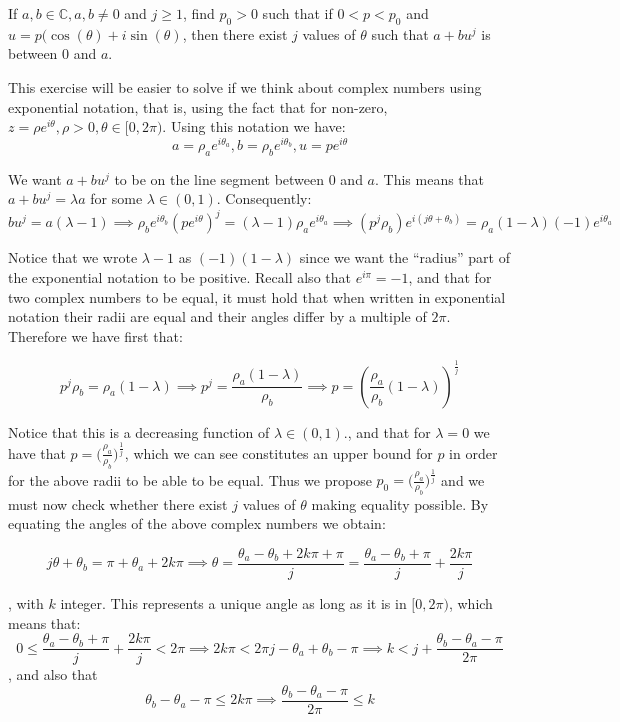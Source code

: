 \begin{exercise}{9}
    If $a, b \in \mathbb{C}, a, b \neq 0$ and $j \geq 1$, find $p_0 > 0$ such that if $0 < p < p_0$ and $u = p(\cos (\theta) + i \sin (\theta)$, then there exist $j$ values of $\theta$ such that $a + bu^j$ is between 0 and $a$.
\end{exercise}

\begin{solution}

    This exercise will be easier to solve if we think about complex numbers using exponential notation, that is, using the fact that for non-zero, $z = \rho e^{i\theta}, \rho > 0, \theta \in [0, 2\pi)$. Using this notation we have:
    $$a = \rho_a e^{i\theta_a}, b = \rho_b e^{i\theta_b}, u = pe^{i\theta}$$

    We want $a+bu^j$ to be on the line segment between 0 and $a$. This means that $a +bu^j = \lambda a$ for some $\lambda \in (0, 1)$. Consequently:
    $$bu^j = a(\lambda -1) \implies \rho_b e^{i\theta_b}(pe^{i\theta})^j = (\lambda - 1)\rho_a e^{i\theta_a} \implies (p^j\rho_b)e^{i(j\theta + \theta_b)} = \rho_a(1 - \lambda)(-1)e^{i\theta_a}$$

    Notice that we wrote $\lambda - 1$ as $(-1)(1 - \lambda)$ since we want the ``radius'' part of the exponential notation to be positive. Recall also that $e^{i\pi} = -1$, and that for two complex numbers to be equal, it must hold that when written in exponential notation their radii are equal and their angles differ by a multiple of $2\pi$. Therefore we have first that:

    $$p^j\rho_b = \rho_a(1 -\lambda) \implies p^j = \frac{\rho_a(1-\lambda)}{\rho_b} \implies p = (\frac{\rho_a}{\rho_b}(1-\lambda))^{\frac{1}{j}}$$

    Notice that this is a decreasing function of $\lambda \in (0, 1)$., and that for $\lambda = 0$ we have that $p = \bigl(\frac{\rho_a}{\rho_b}\bigr)^{\frac{1}{j}}$, which we can see constitutes an upper bound for $p$ in order for the above radii to be able to be equal. Thus we propose $p_0 = \bigl(\frac{\rho_a}{\rho_b}\bigr)^{\frac{1}{j}}$ and we must now check whether there exist $j$ values of $\theta$ making equality possible. By equating the angles of the above complex numbers we obtain:
    
    $$j\theta + \theta_b = \pi + \theta_a + 2k\pi \implies \theta = \frac{\theta_a - \theta_b + 2k\pi + \pi}{j} = \frac{\theta_a - \theta_b + \pi}{j} + \frac{2k\pi}{j}$$

    , with $k$ integer. This represents a unique angle as long as it is in $[0, 2\pi)$, which means that:
    $$0 \leq \frac{\theta_a - \theta_b + \pi}{j} + \frac{2k\pi}{j} < 2\pi \implies 2k\pi < 2\pi j - \theta_a + \theta_b - \pi \implies k < j + \frac{\theta_b - \theta_a - \pi}{2 \pi}$$
    , and also that
    $$ \theta_b - \theta_a - \pi \leq 2k\pi \implies \frac{\theta_b - \theta_a - \pi}{2\pi} \leq k$$


\end{solution}
